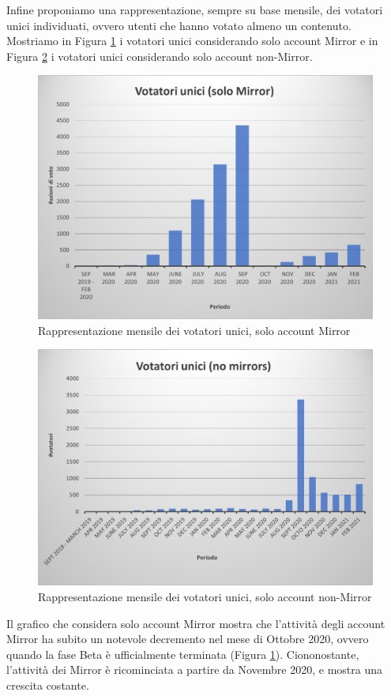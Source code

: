 Infine proponiamo una rappresentazione, sempre su base mensile, dei votatori unici individuati, ovvero utenti che hanno votato almeno un contenuto.
Mostriamo in Figura \ref{fig: uniquevoters_onlymirr} i votatori unici considerando solo account Mirror e in Figura \ref{fig: uniquevoters_nomirr} i votatori unici considerando solo account non-Mirror.

\begin{figure}[t]
    \centering
    \includegraphics[width=.7\textwidth]{graphs/votatori_onlymirr.png}
    \caption{Rappresentazione mensile dei votatori unici, solo account Mirror}
    \label{fig: uniquevoters_onlymirr}
\end{figure}

\begin{figure}[t]
    \centering
    \includegraphics[width=.7\textwidth]{graphs/votatori_nomirr.png}
    \caption{Rappresentazione mensile dei votatori unici, solo account non-Mirror}
    \label{fig: uniquevoters_nomirr}
\end{figure}

Il grafico che considera solo account Mirror mostra che l'attività degli account Mirror ha subito un notevole decremento nel mese di Ottobre 2020, ovvero quando la fase Beta è ufficialmente terminata (Figura \ref{fig: uniquevoters_onlymirr}).
Ciononostante, l'attività dei Mirror è ricominciata a partire da Novembre 2020, e mostra una crescita costante.

